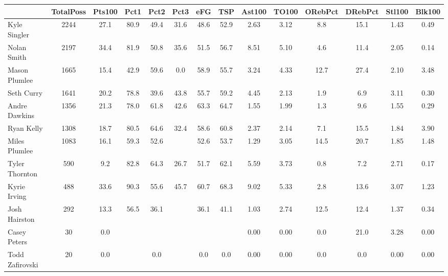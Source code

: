 \documentclass[10pt,letterpaper]{article}
\begin{document}
\begin{table}[ht]
\begin{center}
\begin{tabular}{lccccccccccccc}
  \hline
 & TotalPoss & Pts100 & Pct1 & Pct2 & Pct3 & eFG & TSP & Ast100 & TO100 & ORebPct & DRebPct & Stl100 & Blk100 \\ 
  \hline
Kyle Singler & 2244 & 27.1 & 80.9 & 49.4 & 31.6 & 48.6 & 52.9 & 2.63 & 3.12 & 8.8 & 15.1 & 1.43 & 0.49 \\ 
  Nolan Smith & 2197 & 34.4 & 81.9 & 50.8 & 35.6 & 51.5 & 56.7 & 8.51 & 5.10 & 4.6 & 11.4 & 2.05 & 0.14 \\ 
  Mason Plumlee & 1665 & 15.4 & 42.9 & 59.6 & 0.0 & 58.9 & 55.7 & 3.24 & 4.33 & 12.7 & 27.4 & 2.10 & 3.48 \\ 
  Seth Curry & 1641 & 20.2 & 78.8 & 39.6 & 43.8 & 55.7 & 59.2 & 4.45 & 2.13 & 1.9 & 6.9 & 3.11 & 0.30 \\ 
  Andre Dawkins & 1356 & 21.3 & 78.0 & 61.8 & 42.6 & 63.3 & 64.7 & 1.55 & 1.99 & 1.3 & 9.6 & 1.55 & 0.29 \\ 
  Ryan Kelly & 1308 & 18.7 & 80.5 & 64.6 & 32.4 & 58.6 & 60.8 & 2.37 & 2.14 & 7.1 & 15.5 & 1.84 & 3.90 \\ 
  Miles Plumlee & 1083 & 16.1 & 59.3 & 52.6 &  & 52.6 & 53.7 & 1.29 & 3.05 & 14.5 & 20.7 & 1.85 & 1.48 \\ 
  Tyler Thornton & 590 & 9.2 & 82.8 & 64.3 & 26.7 & 51.7 & 62.1 & 5.59 & 3.73 & 0.8 & 7.2 & 2.71 & 0.17 \\ 
  Kyrie Irving & 488 & 33.6 & 90.3 & 55.6 & 45.7 & 60.7 & 68.3 & 9.02 & 5.33 & 2.8 & 13.6 & 3.07 & 1.23 \\ 
  Josh Hairston & 292 & 13.3 & 56.5 & 36.1 &  & 36.1 & 41.1 & 1.03 & 2.74 & 12.5 & 12.4 & 1.37 & 0.34 \\ 
  Casey Peters & 30 & 0.0 &  &  &  &  &  & 0.00 & 0.00 & 0.0 & 21.0 & 3.28 & 0.00 \\ 
  Todd Zafirovski & 20 & 0.0 &  & 0.0 &  & 0.0 & 0.0 & 0.00 & 0.00 & 0.0 & 0.0 & 0.00 & 0.00 \\ 
   \hline
\end{tabular}
\end{center}
\end{table}
\end{document}
